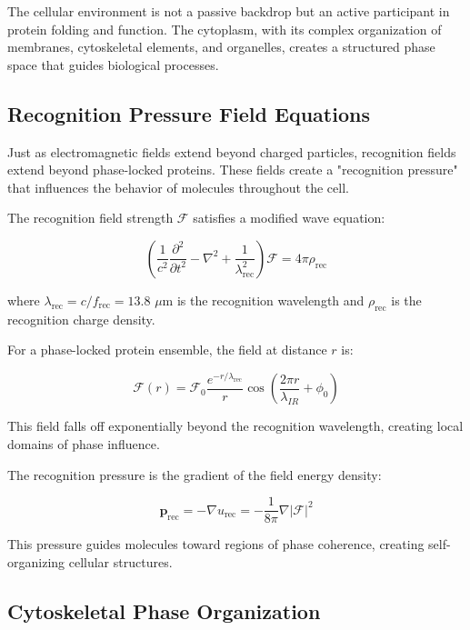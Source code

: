 \documentclass[12pt,a4paper]{report}
\begin{document}
The cellular environment is not a passive backdrop but an active participant in protein folding and function. The cytoplasm, with its complex organization of membranes, cytoskeletal elements, and organelles, creates a structured phase space that guides biological processes.

\subsection{Recognition Pressure Field Equations}

Just as electromagnetic fields extend beyond charged particles, recognition fields extend beyond phase-locked proteins. These fields create a "recognition pressure" that influences the behavior of molecules throughout the cell.

The recognition field strength $\mathcal{F}$ satisfies a modified wave equation:

\begin{equation}
\left(\frac{1}{c^2} \frac{\partial^2}{\partial t^2} - \nabla^2 + \frac{1}{\lambda_{\text{rec}}^2}\right) \mathcal{F} = 4\pi \rho_{\text{rec}}
\end{equation}

where $\lambda_{\text{rec}} = c/f_{\text{rec}} = 13.8$ $\mu$m is the recognition wavelength and $\rho_{\text{rec}}$ is the recognition charge density.

For a phase-locked protein ensemble, the field at distance $r$ is:

\begin{equation}
\mathcal{F}(r) = \mathcal{F}_0 \frac{e^{-r/\lambda_{\text{rec}}}}{r} \cos\left(\frac{2\pi r}{\lambda_{IR}} + \phi_0\right)
\end{equation}

This field falls off exponentially beyond the recognition wavelength, creating local domains of phase influence.

The recognition pressure is the gradient of the field energy density:

\begin{equation}
\mathbf{p}_{\text{rec}} = -\nabla u_{\text{rec}} = -\frac{1}{8\pi} \nabla|\mathcal{F}|^2
\end{equation}

This pressure guides molecules toward regions of phase coherence, creating self-organizing cellular structures.

\subsection{Cytoskeletal Phase Organization}
\end{document}
